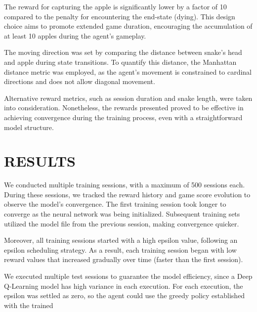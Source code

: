 \documentclass[conference]{IEEEtran}
\begin{document}
The reward for capturing the apple is significantly lower by a factor of 10 compared to the penalty for encountering the end-state (dying). This design choice aims to promote extended game duration, encouraging the accumulation of at least 10 apples during the agent's gameplay.

The moving direction was set by comparing the distance between snake's head and apple during state transitions. To quantify this distance, the Manhattan distance metric was employed, as the agent's movement is constrained to cardinal directions and does not allow diagonal movement.

Alternative reward metrics, such as session duration and snake length, were taken into consideration. Nonetheless, the rewards presented proved to be effective in achieving convergence during the training process, even with a straightforward model structure.

\section{RESULTS}

We conducted multiple training sessions, with a maximum of 500 sessions each. During these sessions, we tracked the reward history and game score evolution to observe the model's convergence. The first training session took longer to converge as the neural network was being initialized. Subsequent training sets utilized the model file from the previous session, making convergence quicker.

Moreover, all training sessions started with a high epsilon value, following an epsilon scheduling strategy. As a result, each training session began with low reward values that increased gradually over time (faster than the first session).

We executed multiple test sessions to guarantee the model efficiency, since a Deep Q-Learning model has high variance in each execution. For each execution, the epsilon was settled as zero, so the agent could use the greedy policy established with the trained 
\end{document}
